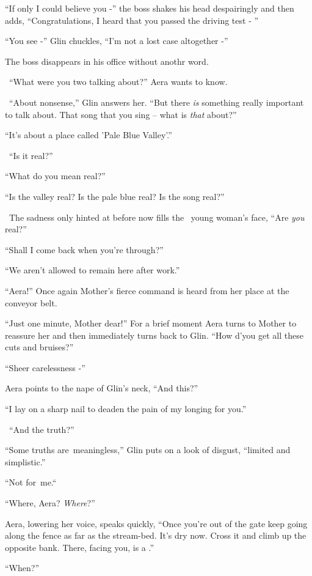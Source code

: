 \documentclass[twoside,11pt]{book}
\begin{document}
``If only I could believe you -'' the boss shakes his head despairingly and
then adds, ``Congratulations, I heard that you passed the driving test - ''

``You see -'' Glin chuckles, ``I'm not a lost case altogether
-''

The boss disappears in his office without anothr word.

{\ }``What were you two talking about?'' Aera wants to know.

~``About nonsense,'' Glin answers her. ``But there \textit{is} something really
important to talk about. That song that you sing -- what is \textit{that} about?''

``It's about a place called 'Pale Blue Valley'.''

~``Is it real?''

``What do you mean real?''

``Is the valley real? Is the pale blue real? Is the song real?''

~The sadness only hinted at before now fills the \ young woman's face, ``Are \textit{you}
real?''

``Shall I come back when you're through?''

``We aren't allowed to remain here after work.''

``Aera!'' Once again Mother's fierce command is heard from her place at the conveyor belt.

``Just one minute, Mother dear!'' For a brief moment\MakeUppercase{ a}era turns to Mother to
reassure her and then immediately turns back to Glin. ``How d'you get all these cuts and
bruises?''

``Sheer carelessness -''

Aera points to the nape of Glin's neck, ``And this?''

``I lay on a sharp nail to deaden the pain of my longing for you.''

~``And the truth?''

``Some truths are~meaningless,'' Glin puts on a look of disgust, ``limited and
simplistic.''

``Not for~me.``~

``Where, Aera? \textit{Where}?''

Aera, lowering her voice, speaks quickly, ``Once you're out of the gate keep going along the fence as far
as the stream-bed. It's dry now. Cross it and climb up the opposite bank. There, facing you, is a .''

``When?''
\end{document}
